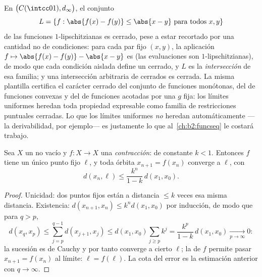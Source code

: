 \begin{example}\label{ex:b2:metric:lipclosed}
En $\bigl(C(\intcc01), d_\infty\bigr)$, el conjunto
\[
L = \{f : \abs{f(x) - f(y)} \leq \abs{x - y}
\ \text{para todos } x, y\}
\]
de las funciones $1$-lipschitzianas es cerrado, pese a estar
recortado por una cantidad no  de condiciones: para cada
par fijo $(x, y)$, la aplicación $f \mapsto \abs{f(x) - f(y)} -
\abs{x - y}$ es  (las evaluaciones son
$1$-lipschitzianas), de modo que cada condición aislada define un
cerrado, y $L$ es la \emph{intersección} de esa familia; y una
intersección arbitraria de cerrados es cerrada. La misma plantilla
certifica el carácter cerrado del conjunto de funciones monótonas,
del de funciones convexas y del de funciones acotadas por una $g$
fija: los límites uniformes heredan toda propiedad expresable como
familia de restricciones puntuales cerradas. Lo que los límites
uniformes \emph{no} heredan automáticamente ---la derivabilidad,
por ejemplo--- es justamente lo que al~\cref{ch:b2:funcseq} le
costará trabajo.
\end{example}

\begin{theorem}\label{thm:b2:metric:banach}
Sea $X$ un  no vacío y $f \colon X \to X$
una \emph{contracción}:  de constante $k < 1$. Entonces
$f$ tiene un único punto fijo $\ell$, y toda órbita $x_{n+1} =
f(x_n)$ converge a $\ell$, con
\[
d(x_n, \ell) \leq \frac{k^n}{1 - k}\, d(x_1, x_0) .
\]
\end{theorem}

\begin{proof}
Unicidad: dos puntos fijos están a distancia $\leq k$ veces esa misma
distancia. Existencia: $d(x_{n+1}, x_n) \leq k^n d(x_1, x_0)$ por
inducción, de modo que para $q > p$,
\[
d(x_q, x_p) \leq \sum_{j=p}^{q-1} d(x_{j+1}, x_j)
\leq d(x_1, x_0) \sum_{j \geq p} k^j
= \frac{k^p}{1-k}\, d(x_1, x_0) \xrightarrow[p\to\infty]{} 0 :
\]
la sucesión es de Cauchy y por tanto converge a cierto $\ell$; la
 de $f$ permite pasar $x_{n+1} = f(x_n)$ al límite: $\ell
= f(\ell)$. La cota del error es la estimación anterior con $q \to
\infty$.
\end{proof}

